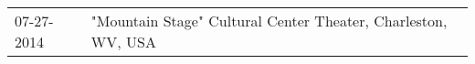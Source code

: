 \begin{supertabular}{ll}
 07-27-2014 &  "Mountain Stage" Cultural Center Theater, Charleston, WV, USA \\
\end{supertabular}
